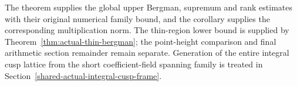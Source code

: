 The theorem supplies the global upper Bergman, supremum and rank
estimates with their original numerical family bound, and the
corollary supplies the corresponding multiplication norm.  The
thin-region lower bound is supplied by
Theorem~\ref{thm:actual-thin-bergman}; the point-height comparison
and final arithmetic section remainder remain separate.  Generation of the entire
integral cusp lattice from the short coefficient-field spanning
family is treated in Section~\ref{shared-actual-integral-cusp-frame}.

